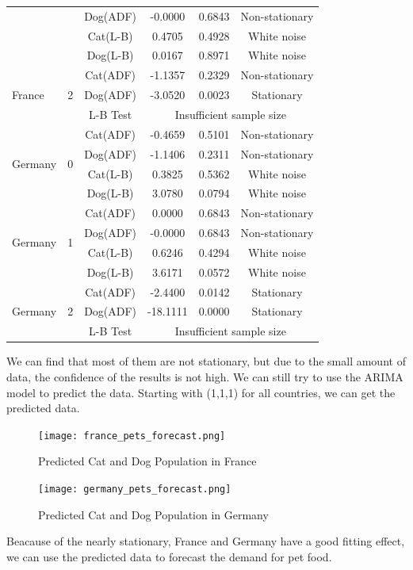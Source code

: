 \documentclass[withoutpreface,bwprint]{cumcmthesis} %
\begin{document}
\begin{table}[htbp]
\begin{tabular}{llcccc}
& & Dog(ADF) & -0.0000 & 0.6843 & Non-stationary \\
& & Cat(L-B) & 0.4705 & 0.4928 & White noise \\
& & Dog(L-B) & 0.0167 & 0.8971 & White noise \\
\midrule
\multirow{3}{*}{France} & \multirow{3}{*}{2} & Cat(ADF) & -1.1357 & 0.2329 & Non-stationary \\
& & Dog(ADF) & -3.0520 & 0.0023 & Stationary \\
& & L-B Test & \multicolumn{3}{c}{Insufficient sample size} \\
\midrule
\multirow{4}{*}{Germany} & \multirow{4}{*}{0} & Cat(ADF) & -0.4659 & 0.5101 & Non-stationary \\
& & Dog(ADF) & -1.1406 & 0.2311 & Non-stationary \\
& & Cat(L-B) & 0.3825 & 0.5362 & White noise \\
& & Dog(L-B) & 3.0780 & 0.0794 & White noise \\
\midrule
\multirow{4}{*}{Germany} & \multirow{4}{*}{1} & Cat(ADF) & 0.0000 & 0.6843 & Non-stationary \\
& & Dog(ADF) & -0.0000 & 0.6843 & Non-stationary \\
& & Cat(L-B) & 0.6246 & 0.4294 & White noise \\
& & Dog(L-B) & 3.6171 & 0.0572 & White noise \\
\midrule
\multirow{3}{*}{Germany} & \multirow{3}{*}{2} & Cat(ADF) & -2.4400 & 0.0142 & Stationary \\
& & Dog(ADF) & -18.1111 & 0.0000 & Stationary \\
& & L-B Test & \multicolumn{3}{c}{Insufficient sample size} \\
\bottomrule
\end{tabular}
\end{table}
\par We can find that most of them are not stationary, but due to the small amount of data, the confidence of the results is not high.
We can still try to use the ARIMA model to predict the data.
Starting with (1,1,1) for all countries, we can get the predicted data.
\clearpage
\begin{figure}[htbp]
	\centering
	\texttt{[image: france\_pets\_forecast.png]}
	\caption{Predicted Cat and Dog Population in France}
\end{figure}
\begin{figure}[htbp]
	\centering
	\texttt{[image: germany\_pets\_forecast.png]}
	\caption{Predicted Cat and Dog Population in Germany}
\end{figure}
\par Beacause of the nearly stationary, France and Germany have a good fitting effect, we can use the predicted data to forecast the demand for pet food.
\end{document}
